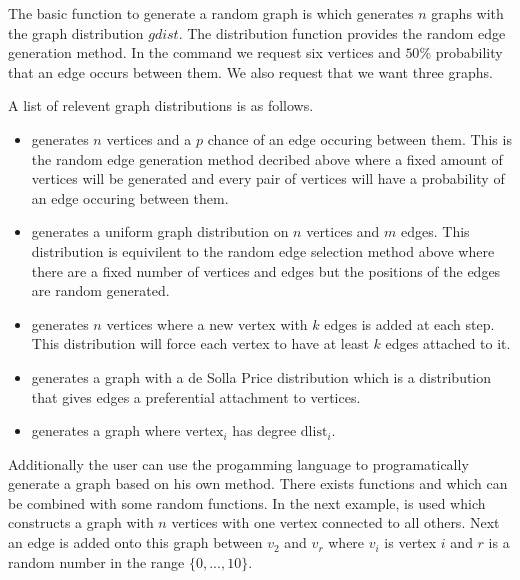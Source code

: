     The basic function to generate a random graph is  which generates $n$ graphs with the graph distribution $gdist$. The distribution function  provides the random edge generation method. In the command  we request six vertices and $50\%$ probability that an edge occurs between them. We also request that we want three graphs.

    


    A list of relevent graph distributions is as follows.

    \begin{itemize}
    \item
     generates $n$ vertices and a $p$ chance of an edge occuring between them. This is the random edge generation method decribed above where a fixed amount of vertices will be generated and every pair of vertices will have a probability of an edge occuring between them.

    \item 
     generates a uniform graph distribution on $n$ vertices and $m$ edges. This distribution is equivilent to the random edge selection method above where there are a fixed number of vertices and edges but the positions of the edges are random generated.

    \item 
     generates $n$ vertices where a new vertex with $k$ edges is added at each step. This distribution will force each vertex to have at least $k$ edges attached to it.

    \item
     generates a graph with a de Solla Price distribution which is a distribution that gives edges a preferential attachment to vertices.

    \item
     generates a graph where $\mathrm{vertex}_i$ has degree $\mathrm{dlist}_i$.
    \end{itemize}

    Additionally the user can use the progamming language to programatically generate a graph based on his own method. There exists functions  and  which can be combined with some random functions. In the next example,  is used which constructs a graph with $n$ vertices with one vertex connected to all others. Next an edge is added onto this graph between $v_2$ and $v_r$ where $v_i$ is vertex $i$ and $r$ is a random number in the range $\{0,...,10\}$.

